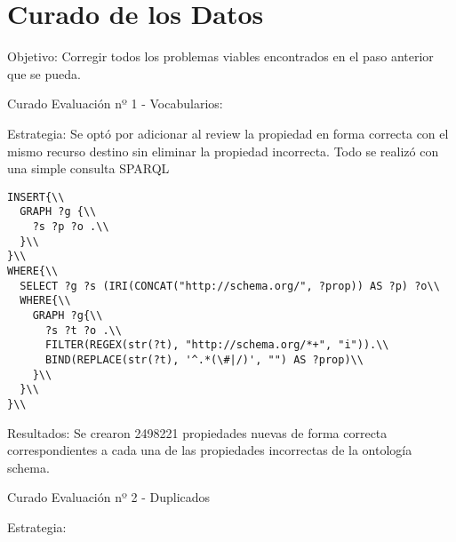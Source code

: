 \chapter{Curado de los Datos}
\label{chapter:curado}

Objetivo:
Corregir todos los problemas viables encontrados en el paso anterior que se pueda.

Curado Evaluación nº 1 - Vocabularios:

Estrategia:
Se optó por adicionar al review la propiedad en forma correcta con el mismo recurso destino sin eliminar la propiedad incorrecta. 
Todo se realizó con una simple consulta SPARQL
\begin{lstlisting}[frame=single]  
INSERT{\\
  GRAPH ?g {\\
    ?s ?p ?o .\\
  }\\
}\\
WHERE{\\
  SELECT ?g ?s (IRI(CONCAT("http://schema.org/", ?prop)) AS ?p) ?o\\
  WHERE{\\
    GRAPH ?g{\\
      ?s ?t ?o .\\
      FILTER(REGEX(str(?t), "http://schema.org/*+", "i")).\\
      BIND(REPLACE(str(?t), '^.*(\#|/)', "") AS ?prop)\\
    }\\
  }\\
}\\
\end{lstlisting}


Resultados:
Se crearon 2498221 propiedades nuevas de forma correcta correspondientes a cada una de las propiedades incorrectas de la ontología 
schema.

Curado Evaluación nº 2 - Duplicados

Estrategia: 

